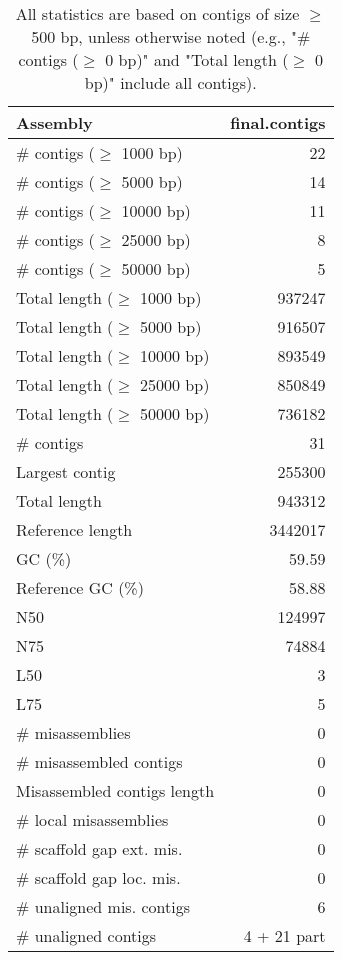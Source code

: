 \documentclass[12pt,a4paper]{article}
\begin{document}
\begin{table}[ht]
\begin{center}
\caption{All statistics are based on contigs of size $\geq$ 500 bp, unless otherwise noted (e.g., "\# contigs ($\geq$ 0 bp)" and "Total length ($\geq$ 0 bp)" include all contigs).}
\begin{tabular}{|l*{1}{|r}|}
\hline
Assembly & final.contigs \\ \hline
\# contigs ($\geq$ 1000 bp) & 22 \\ \hline
\# contigs ($\geq$ 5000 bp) & 14 \\ \hline
\# contigs ($\geq$ 10000 bp) & 11 \\ \hline
\# contigs ($\geq$ 25000 bp) & 8 \\ \hline
\# contigs ($\geq$ 50000 bp) & 5 \\ \hline
Total length ($\geq$ 1000 bp) & 937247 \\ \hline
Total length ($\geq$ 5000 bp) & 916507 \\ \hline
Total length ($\geq$ 10000 bp) & 893549 \\ \hline
Total length ($\geq$ 25000 bp) & 850849 \\ \hline
Total length ($\geq$ 50000 bp) & 736182 \\ \hline
\# contigs & 31 \\ \hline
Largest contig & 255300 \\ \hline
Total length & 943312 \\ \hline
Reference length & 3442017 \\ \hline
GC (\%) & 59.59 \\ \hline
Reference GC (\%) & 58.88 \\ \hline
N50 & 124997 \\ \hline
N75 & 74884 \\ \hline
L50 & 3 \\ \hline
L75 & 5 \\ \hline
\# misassemblies & 0 \\ \hline
\# misassembled contigs & 0 \\ \hline
Misassembled contigs length & 0 \\ \hline
\# local misassemblies & 0 \\ \hline
\# scaffold gap ext. mis. & 0 \\ \hline
\# scaffold gap loc. mis. & 0 \\ \hline
\# unaligned mis. contigs & 6 \\ \hline
\# unaligned contigs & 4 + 21 part \\ \hline

\end{tabular}
\end{center}
\end{table}
\end{document}
